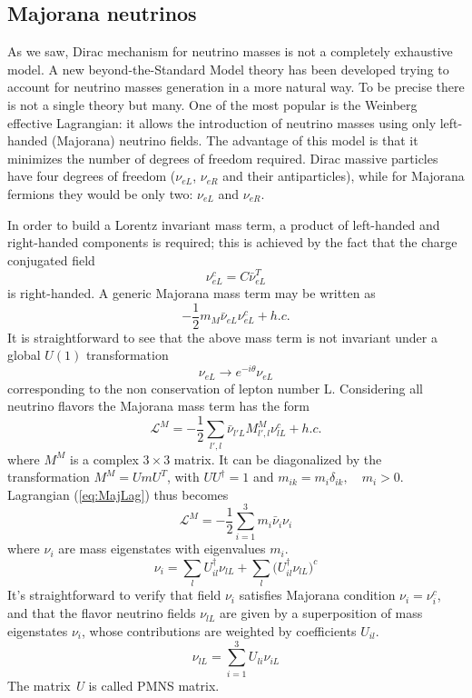 \documentclass{subnucbo}
\begin{document}
\subsection{Majorana neutrinos}
As we saw, Dirac mechanism for neutrino masses is not a completely exhaustive model.
A new beyond-the-Standard Model theory has been developed trying to account for neutrino masses generation in a more natural way. To be precise there is not a single theory but many. %
One of the most popular is the Weinberg effective Lagrangian: it allows the introduction of neutrino masses using only left-handed (Majorana) neutrino fields.
The advantage of this model is that it minimizes the number of degrees of freedom required. 
Dirac massive particles have four degrees of freedom ($\nu_{eL}$, $\nu_{eR}$ and their antiparticles), while for Majorana fermions they would be only two: $\nu_{eL}$ and $\nu_{eR}$. 

In order to build a Lorentz invariant mass term, a product of left-handed and right-handed components is required; this is achieved by the fact that the charge conjugated field
\begin{equation}
\nu_{eL}^c=C\bar{\nu}_{eL}^T
\end{equation}
is right-handed. A generic Majorana mass term may be written as
\begin{equation}
-\frac{1}{2}m_M\bar{\nu}_{eL}\nu_{eL}^c+h.c.
\end{equation}
It is straightforward to see that the above mass term is not invariant under a global $U(1)$ transformation
\begin{equation}
\nu_{eL}\rightarrow e^{-i\theta}\nu_{eL}
\end{equation}
corresponding to the non conservation of lepton number L.
Considering all neutrino flavors the Majorana mass term has the form
\begin{equation}
\label{eq:MajLag}
\mathcal{L}^M=-\frac{1}{2}\sum_{l',l}\bar{\nu}_{l'L}M_{l',l}^M\nu_{lL}^c+h.c.
\end{equation}
where $M^M$ is a complex $3\times3$ matrix. It can be diagonalized by the transformation $M^M=UmU^T$, with $UU^{\dagger}=1$ and  $m_{ik}=m_i\delta_{ik},\quad m_i>0$.
Lagrangian (\ref{eq:MajLag}) thus becomes
\begin{equation}
\mathcal{L}^M=-\frac{1}{2}\sum_{i=1}^3m_i\bar{\nu}_i\nu_i
\end{equation}
where $\nu_i$ are mass eigenstates with eigenvalues $m_i$.
\begin{equation}
\nu_i=\sum_lU_{il}^{\dagger}\nu_{lL}+\sum_l\bigl(U_{il}^{\dagger}\nu_{lL}\bigr)^c
\end{equation}
It's straightforward to verify that field $\nu_i$ satisfies Majorana condition $\nu_i=\nu_i^c$, and that the flavor neutrino fields $\nu_{lL}$ are given by a superposition of mass eigenstates $\nu_i$, whose contributions are weighted by coefficients $U_{il}$. 
\begin{equation}
\label{eq:nuMix}
\nu_{lL}=\sum_{i=1}^3U_{li}\nu_{iL}
\end{equation}
The matrix \emph{U} is called PMNS matrix.
\end{document}
